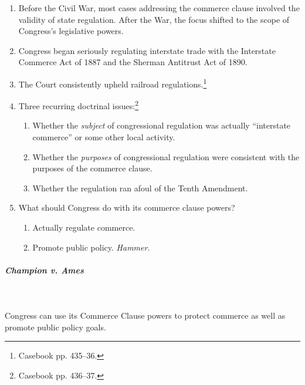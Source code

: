 \begin{enumerate}
    \item Before the Civil War, most cases addressing the commerce clause 
    involved the validity of state regulation. After the War, the focus 
    shifted to the scope of Congress's legislative powers.
    \item Congress began seriously regulating interstate trade with the 
    Interstate Commerce Act of 1887 and the Sherman Antitrust Act of 1890.
    \item The Court consistently upheld railroad 
    regulations.\footnote{Casebook pp. 435--36.}
    \item Three recurring doctrinal issues:\footnote{Casebook pp. 436--37.}
    \begin{enumerate}
        \item Whether the \emph{subject} of congressional regulation was 
        actually ``interstate commerce'' or some other local activity.
        \item Whether the \emph{purposes} of congressional regulation were 
        consistent with the purposes of the commerce clause.
        \item Whether the regulation ran afoul of the Tenth Amendment.
    \end{enumerate}
    \item What should Congress do with its commerce clause powers?\begin{enumerate}
        \item Actually regulate commerce.
        \item Promote public policy. \emph{Hammer}.
    \end{enumerate}
\end{enumerate}

\paragraph{\emph{Champion v. Ames}}
~\\\\
Congress can use its Commerce Clause powers to protect commerce as well as 
promote public policy goals.

